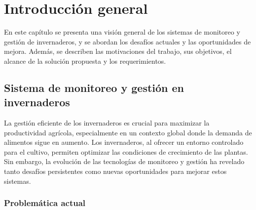 
\chapter{Introducción general} %

\label{Chapter1} %
\label{IntroGeneral}


\newcommand{\keyword}[1]{\textbf{#1}}
\newcommand{\tabhead}[1]{\textbf{#1}}
\newcommand{\code}[1]{\texttt{#1}}
\newcommand{\file}[1]{\texttt{\bfseries#1}}
\newcommand{\option}[1]{\texttt{\itshape#1}}
\newcommand{\grados}{$^{\circ}$}


En este capítulo se presenta una visión general de los sistemas de monitoreo y gestión de invernaderos, y se abordan los desafíos actuales y las oportunidades de mejora. Además, se describen las motivaciones del trabajo, sus objetivos, el alcance de la solución propuesta y los requerimientos.
\section{Sistema de monitoreo y gestión en invernaderos}

La gestión eficiente de los invernaderos es crucial para maximizar la productividad agrícola, especialmente en un contexto global donde la demanda de alimentos sigue en aumento. Los invernaderos, al ofrecer un entorno controlado para el cultivo, permiten optimizar las condiciones de crecimiento de las plantas. Sin embargo, la evolución de las tecnologías de monitoreo y gestión ha revelado tanto desafíos persistentes como nuevas oportunidades para mejorar estos sistemas.

\subsection{Problemática actual}

